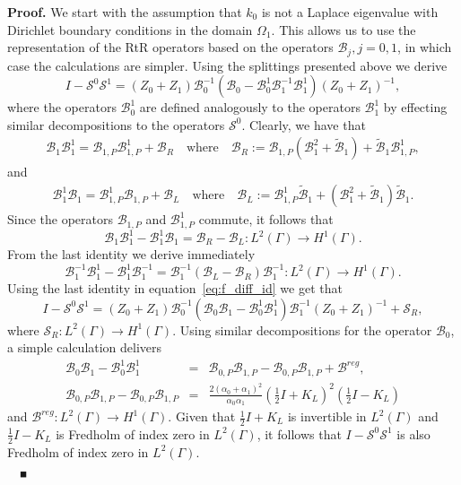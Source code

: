 \documentclass[11pt]{article}
\numberwithin{equation}{section}
\newenvironment{proof}{\hspace{0.5cm} {\bf Proof.}}
{$\quad {}_\blacksquare$\vspace{0.3cm}}
\begin{document}
  \begin{proof}
 We start with the assumption that $k_0$ is not a Laplace eigenvalue with Dirichlet boundary conditions in the domain $\Omega_1$. This allows us to use the representation of the RtR operators based on the operators $\mathcal{B}_j,j=0,1$, in which case the calculations are simpler. Using the splittings presented above we derive
  \begin{equation}\label{eq:f_diff_id}
  I-\mathcal{S}^0\mathcal{S}^1=(Z_0+Z_1)\mathcal{B}_0^{-1}(\mathcal{B}_0-\mathcal{B}_0^1\mathcal{B}_1^{-1}\mathcal{B}_1^1)(Z_0+Z_1)^{-1},
  \end{equation}
  where the operators $\mathcal{B}_0^1$ are defined analogously to the operators $\mathcal{B}_1^1$ by effecting similar decompositions to the operators $\mathcal{S}^0$. Clearly, we have that
  \begin{eqnarray*}
    \mathcal{B}_1\mathcal{B}_1^1=\mathcal{B}_{1,P}\mathcal{B}_{1,P}^1 +\mathcal{B}_R\quad\mbox{where}\quad
    \mathcal{B}_R:=\mathcal{B}_{1,P}(\mathcal{B}_1^2+\widetilde{\mathcal{B}}_1)+\widetilde{\mathcal{B}}_1\mathcal{B}_{1,P}^1,
  \end{eqnarray*}
  and
  \begin{eqnarray*}
   \mathcal{B}_1^1 \mathcal{B}_1=\mathcal{B}_{1,P}^1\mathcal{B}_{1,P}+\mathcal{B}_L\quad\mbox{where}\quad
    \mathcal{B}_L:=\mathcal{B}_{1,P}^1\widetilde{\mathcal{B}}_1+(\mathcal{B}_1^2+\widetilde{\mathcal{B}}_1)\widetilde{\mathcal{B}}_1.
  \end{eqnarray*}
  Since the operators $\mathcal{B}_{1,P}$ and $\mathcal{B}_{1,P}^1$ commute, it follows that
  \[
  \mathcal{B}_1\mathcal{B}_1^1-\mathcal{B}_1^1 \mathcal{B}_1=\mathcal{B}_R-\mathcal{B}_L:L^2(\Gamma)\to H^1(\Gamma).
  \]
  From the last identity we derive immediately
  \[
  \mathcal{B}_1^{-1}\mathcal{B}_1^1-\mathcal{B}_1^1 \mathcal{B}_1^{-1}=\mathcal{B}_1^{-1}(\mathcal{B}_L-\mathcal{B}_R)\mathcal{B}_1^{-1}:L^2(\Gamma)\to H^1(\Gamma).
  \]
  Using the last identity in equation~\eqref{eq:f_diff_id} we get that
  \[
  I-\mathcal{S}^0\mathcal{S}^1=(Z_0+Z_1)\mathcal{B}_0^{-1}(\mathcal{B}_0\mathcal{B}_1-\mathcal{B}_0^1\mathcal{B}_1^1)\mathcal{B}_1^{-1}(Z_0+Z_1)^{-1}+\mathcal{S}_R,
  \]
  where $\mathcal{S}_R:L^2(\Gamma)\to H^1(\Gamma)$. Using similar decompositions for the operator $\mathcal{B}_0$, a simple calculation delivers
  \begin{eqnarray*}
    \mathcal{B}_0\mathcal{B}_1-\mathcal{B}_0^1\mathcal{B}_1^1&=&\mathcal{B}_{0,P}\mathcal{B}_{1,P}-\mathcal{B}_{0,P}\mathcal{B}_{1,P}+\mathcal{B}^{reg},\\
    \mathcal{B}_{0,P}\mathcal{B}_{1,P}-\mathcal{B}_{0,P}\mathcal{B}_{1,P}&=&\frac{2(\alpha_0+\alpha_1)^2}{\alpha_0\alpha_1}\left(\frac{1}{2}I+K_L\right)^2\left(\frac{1}{2}I-K_L\right)
  \end{eqnarray*}
  and $\mathcal{B}^{reg}:L^2(\Gamma)\to H^1(\Gamma)$. Given that $\frac{1}{2}I+K_L$ is invertible in $L^2(\Gamma)$ and $\frac{1}{2}I-K_L$ is Fredholm of index zero in $L^2(\Gamma)$, it follows that $I-\mathcal{S}^0\mathcal{S}^1$ is also Fredholm of index zero in $L^2(\Gamma)$.


\end{proof}
\end{document}
